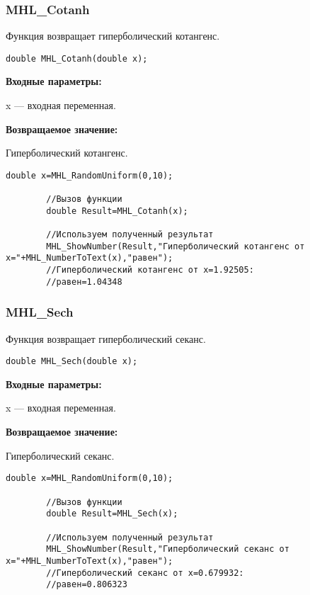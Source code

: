 \documentclass[a4paper,12pt]{article}
\begin{document}
\subsubsection{MHL\_Cotanh}\label{MHL_Cotanh}

Функция возвращает гиперболический котангенс.


\begin{lstlisting}[label=code_syntax_MHL_Cotanh,caption=Синтаксис]
double MHL_Cotanh(double x);
\end{lstlisting}

\textbf{Входные параметры:}

 x --- входная переменная.

\textbf{Возвращаемое значение:}

Гиперболический котангенс.


\begin{lstlisting}[label=code_use_MHL_Cotanh,caption=Пример использования]
        double x=MHL_RandomUniform(0,10);

        //Вызов функции
        double Result=MHL_Cotanh(x);

        //Используем полученный результат
        MHL_ShowNumber(Result,"Гиперболический котангенс от x="+MHL_NumberToText(x),"равен");
        //Гиперболический котангенс от x=1.92505:
        //равен=1.04348
\end{lstlisting}

\subsubsection{MHL\_Sech}\label{MHL_Sech}

Функция возвращает гиперболический секанс.


\begin{lstlisting}[label=code_syntax_MHL_Sech,caption=Синтаксис]
double MHL_Sech(double x);
\end{lstlisting}

\textbf{Входные параметры:}

 x --- входная переменная.

\textbf{Возвращаемое значение:}

Гиперболический секанс.


\begin{lstlisting}[label=code_use_MHL_Sech,caption=Пример использования]
        double x=MHL_RandomUniform(0,10);

        //Вызов функции
        double Result=MHL_Sech(x);

        //Используем полученный результат
        MHL_ShowNumber(Result,"Гиперболический секанс от x="+MHL_NumberToText(x),"равен");
        //Гиперболический секанс от x=0.679932:
        //равен=0.806323
\end{lstlisting}
\end{document}
